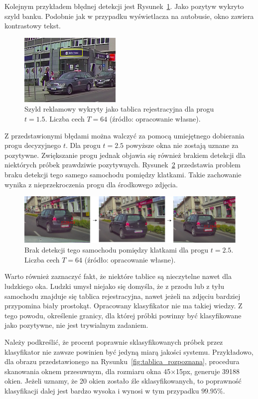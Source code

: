 \FloatBarrier
Kolejnym przykładem błędnej detekcji jest Rysunek~\ref{fig:bank}.
Jako pozytyw wykryto szyld banku.
Podobnie jak w przypadku wyświetlacza na autobusie, okno zawiera kontrastowy tekst.
\begin{figure}[!ht]
    \centering
    \includegraphics[scale=1]{Pictures/bank}
    \caption{Szyld reklamowy wykryty jako tablica rejestracyjna dla progu $t=1.5$. Liczba cech $T=64$ (źródło: opracowanie własne).}
    \label{fig:bank}
\end{figure}
\FloatBarrier
Z przedstawionymi błędami można walczyć za pomocą umiejętnego dobierania progu decyzyjnego $t$.
Dla progu $t=2.5$ powyższe okna nie zostają uznane za pozytywne.
Zwiększanie progu jednak objawia się również brakiem detekcji dla niektórych próbek prawdziwie pozytywnych.
Rysunek~\ref{fig:same_car} przedstawia problem braku detekcji tego samego samochodu pomiędzy klatkami.
Takie zachowanie wynika z nieprzekroczenia progu dla środkowego zdjęcia.
\begin{figure}[!ht]
    \centering
    \includegraphics[scale=0.4]{Pictures/same_car}
    \caption{Brak detekcji tego samochodu pomiędzy klatkami dla progu $t=2.5$. Liczba cech $T=64$ (źródło: opracowanie własne).}
    \label{fig:same_car}
\end{figure}
\FloatBarrier
Warto również zaznaczyć fakt, że niektóre tablice są nieczytelne nawet dla ludzkiego oka.
Ludzki umysł niejako się domyśla, że z przodu lub z tyłu samochodu znajduje się tablica rejestracyjna, nawet jeżeli na zdjęciu bardziej przypomina biały prostokąt.
Opracowany klasyfikator nie ma takiej wiedzy.
Z tego powodu, określenie granicy, dla której próbki powinny być klasyfikowane jako pozytywne, nie jest trywialnym zadaniem.

Należy podkreślić, że procent poprawnie sklasyfikowanych próbek przez klasyfikator nie zawsze powinien być jedyną miarą jakości systemu.
Przykładowo, dla obrazu przedstawionego na Rysunku~\ref{fig:tablica_rozpoznana}, procedura skanowania oknem przesuwnym, dla rozmiaru okna
45$\times$15px, generuje 39188 okien.
Jeżeli uznamy, że 20 okien zostało źle sklasyfikowanych, to poprawność klasyfikacji dalej jest bardzo wysoka i wynosi w tym przypadku $99.95\%$.


